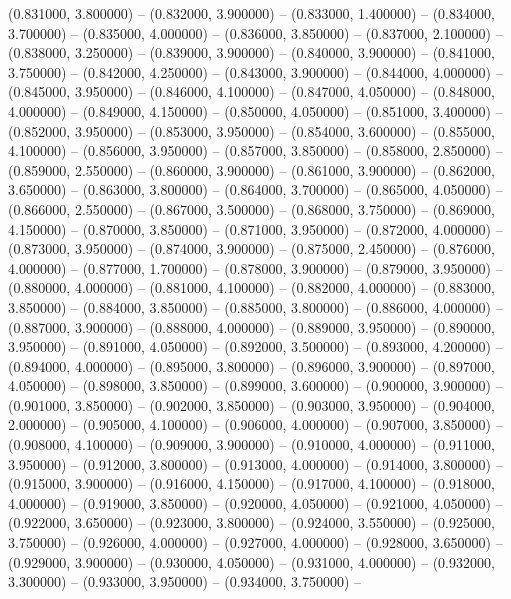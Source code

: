 (0.831000, 3.800000) -- 
(0.832000, 3.900000) -- 
(0.833000, 1.400000) -- 
(0.834000, 3.700000) -- 
(0.835000, 4.000000) -- 
(0.836000, 3.850000) -- 
(0.837000, 2.100000) -- 
(0.838000, 3.250000) -- 
(0.839000, 3.900000) -- 
(0.840000, 3.900000) -- 
(0.841000, 3.750000) -- 
(0.842000, 4.250000) -- 
(0.843000, 3.900000) -- 
(0.844000, 4.000000) -- 
(0.845000, 3.950000) -- 
(0.846000, 4.100000) -- 
(0.847000, 4.050000) -- 
(0.848000, 4.000000) -- 
(0.849000, 4.150000) -- 
(0.850000, 4.050000) -- 
(0.851000, 3.400000) -- 
(0.852000, 3.950000) -- 
(0.853000, 3.950000) -- 
(0.854000, 3.600000) -- 
(0.855000, 4.100000) -- 
(0.856000, 3.950000) -- 
(0.857000, 3.850000) -- 
(0.858000, 2.850000) -- 
(0.859000, 2.550000) -- 
(0.860000, 3.900000) -- 
(0.861000, 3.900000) -- 
(0.862000, 3.650000) -- 
(0.863000, 3.800000) -- 
(0.864000, 3.700000) -- 
(0.865000, 4.050000) -- 
(0.866000, 2.550000) -- 
(0.867000, 3.500000) -- 
(0.868000, 3.750000) -- 
(0.869000, 4.150000) -- 
(0.870000, 3.850000) -- 
(0.871000, 3.950000) -- 
(0.872000, 4.000000) -- 
(0.873000, 3.950000) -- 
(0.874000, 3.900000) -- 
(0.875000, 2.450000) -- 
(0.876000, 4.000000) -- 
(0.877000, 1.700000) -- 
(0.878000, 3.900000) -- 
(0.879000, 3.950000) -- 
(0.880000, 4.000000) -- 
(0.881000, 4.100000) -- 
(0.882000, 4.000000) -- 
(0.883000, 3.850000) -- 
(0.884000, 3.850000) -- 
(0.885000, 3.800000) -- 
(0.886000, 4.000000) -- 
(0.887000, 3.900000) -- 
(0.888000, 4.000000) -- 
(0.889000, 3.950000) -- 
(0.890000, 3.950000) -- 
(0.891000, 4.050000) -- 
(0.892000, 3.500000) -- 
(0.893000, 4.200000) -- 
(0.894000, 4.000000) -- 
(0.895000, 3.800000) -- 
(0.896000, 3.900000) -- 
(0.897000, 4.050000) -- 
(0.898000, 3.850000) -- 
(0.899000, 3.600000) -- 
(0.900000, 3.900000) -- 
(0.901000, 3.850000) -- 
(0.902000, 3.850000) -- 
(0.903000, 3.950000) -- 
(0.904000, 2.000000) -- 
(0.905000, 4.100000) -- 
(0.906000, 4.000000) -- 
(0.907000, 3.850000) -- 
(0.908000, 4.100000) -- 
(0.909000, 3.900000) -- 
(0.910000, 4.000000) -- 
(0.911000, 3.950000) -- 
(0.912000, 3.800000) -- 
(0.913000, 4.000000) -- 
(0.914000, 3.800000) -- 
(0.915000, 3.900000) -- 
(0.916000, 4.150000) -- 
(0.917000, 4.100000) -- 
(0.918000, 4.000000) -- 
(0.919000, 3.850000) -- 
(0.920000, 4.050000) -- 
(0.921000, 4.050000) -- 
(0.922000, 3.650000) -- 
(0.923000, 3.800000) -- 
(0.924000, 3.550000) -- 
(0.925000, 3.750000) -- 
(0.926000, 4.000000) -- 
(0.927000, 4.000000) -- 
(0.928000, 3.650000) -- 
(0.929000, 3.900000) -- 
(0.930000, 4.050000) -- 
(0.931000, 4.000000) -- 
(0.932000, 3.300000) -- 
(0.933000, 3.950000) -- 
(0.934000, 3.750000) -- 
